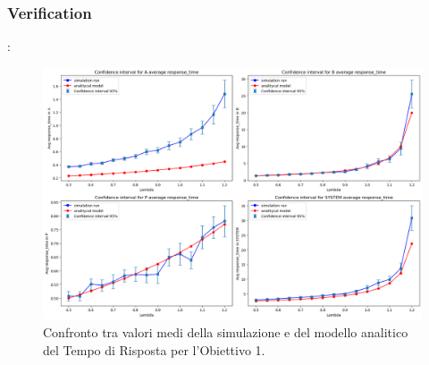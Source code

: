 \subsubsection{Verification}
\begin{frame}{\subsecname: \subsubsecname}
\begin{figure}
    \centering
    \includegraphics[width=0.75\linewidth]{figs/results/obj1/obj1-line-response-time.png}
    \caption{ Confronto tra valori medi della simulazione e del modello analitico del Tempo di Risposta per l’Obiettivo 1.}
    \label{fig:enter-label}
\end{figure}   
\end{frame}